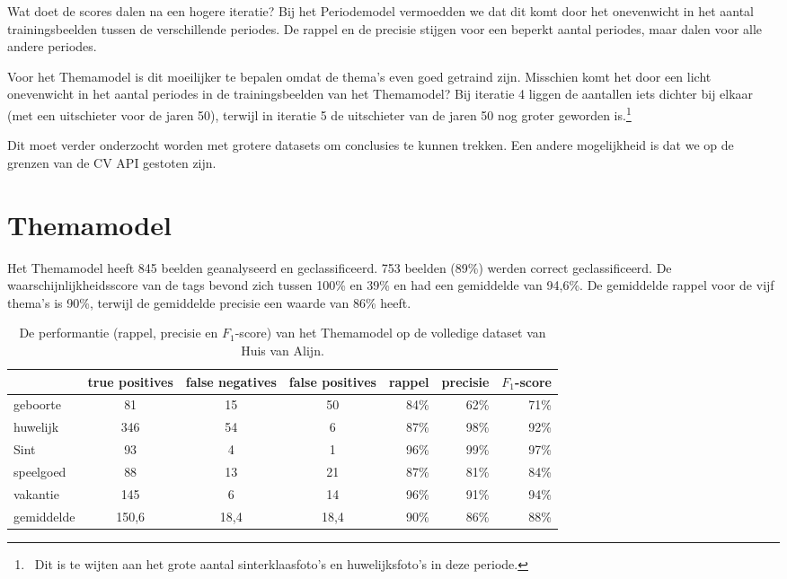 Wat doet de scores dalen na een hogere iteratie? Bij het Periodemodel vermoedden we dat dit komt door het onevenwicht in het aantal trainingsbeelden tussen de verschillende periodes. De rappel en de precisie stijgen voor een beperkt aantal periodes, maar dalen voor alle andere periodes.

Voor het Themamodel is dit moeilijker te bepalen omdat de thema’s even goed getraind zijn. Misschien komt het door een licht onevenwicht in het aantal periodes in de trainingsbeelden van het Themamodel? Bij iteratie 4 liggen de aantallen iets dichter bij elkaar (met een uitschieter voor de jaren 50), terwijl in iteratie 5 de uitschieter van de jaren 50 nog groter geworden is.\footnote{~Dit is te wijten aan het grote aantal sinterklaasfoto's en huwelijksfoto's in deze periode.} 

Dit moet verder onderzocht worden met grotere datasets om conclusies te kunnen trekken. Een andere mogelijkheid is dat we op de grenzen van de CV API gestoten zijn.

\section{Themamodel}
\label{sec:themamodel}

Het Themamodel heeft 845 beelden geanalyseerd en geclassificeerd. 753 beelden (89\%) werden correct geclassificeerd.  De waarschijnlijkheidsscore van de tags bevond zich tussen 100\% en 39\% en had een gemiddelde van 94,6\%. De gemiddelde rappel voor de vijf thema’s is 90\%, terwijl de gemiddelde precisie een waarde van 86\% heeft.

\begin{table}
	\centering
     \renewcommand\arraystretch{1.2}
    \begin{tabular}{l|ccc|rrr}
        \toprule
         & true positives  & false negatives & false positives & rappel & precisie & $F_1$-score \\
        \midrule
        geboorte & 81 & 15 & 50 & 84\% & 62\% & 71\% \\
        huwelijk & 346 & 54 & 6 & 87\% & 98\% & 92\% \\
        Sint & 93 & 4 & 1 & 96\% & 99\% & 97\% \\
        speelgoed & 88 & 13 & 21 & 87\% & 81\% & 84\% \\
        vakantie & 145 & 6 & 14 & 96\% & 91\% & 94\% \\
        \midrule
        gemiddelde & 150,6 & 18,4 & 18,4 & 90\% & 86\% & 88\% \\
        \bottomrule
    \end{tabular}
    \caption[Scores van het Themamodel op de volledige dataset]{De performantie (rappel, precisie en $F_1$-score) van het Themamodel op de volledige dataset van Huis van Alijn.}
    \label{tab:resultaten-themamodel}
\end{table}

